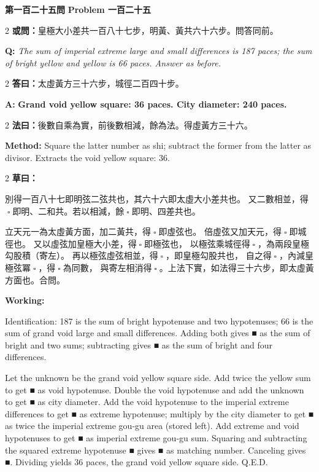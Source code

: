 \documentclass[11pt,a4paper]{article}
\let\origsquare\square
\renewcommand{\square}{\ensuremath{\origsquare}}%
\newcommand{\wen}[1]{%
  \par\vspace{0.5em}%
  \noindent\textcolor{problemcolor}{\textbf{第#1問}}%
  \hfill\textcolor{problemcolor}{\textbf{Problem #1}}\par\nopagebreak%
  \vspace{0.3em}%
}
\newcommand{\owen}[1]{%
  \noindent\textcolor{problemcolor}{\textbf{或問：}}{\tradfont #1}\par\nopagebreak%
}
\newcommand{\oweneng}[1]{%
  \noindent\textcolor{engcolor}{\textbf{Q: }}{\itshape #1}\par\nopagebreak%
}
\newcommand{\fayue}[1]{%
  \noindent\textcolor{methodcolor}{\textbf{法曰：}}{\tradfont #1}\par\nopagebreak%
}
\newcommand{\fayueeng}[1]{%
  \noindent\textcolor{engcolor}{\textbf{Method: }}{#1}\par\nopagebreak%
}
\newcommand{\tsaoyue}[1]{%
  \noindent\textcolor{workcolor}{\textbf{草曰：}}{\tradfont #1}\par%
}
\newcommand{\tsaoyueeng}[1]{%
  \noindent\textcolor{engcolor}{\textbf{Working: }}{\small #1}\par%
}
\newcommand{\dayue}[1]{%
  \noindent\textcolor{anscolor}{\textbf{答曰：}}{\tradfont #1}\par\nopagebreak%
}
\newcommand{\dayueeng}[1]{%
  \noindent\textcolor{engcolor}{\textbf{A: }}{\bfseries #1}\par\nopagebreak%
}
\begin{document}
\vspace{0.5cm}

\wen{一百二十五}

\begin{paracol}{2}
\owen{皇極大小差共一百八十七步，明黃、黃共六十六步。問答同前。}
\switchcolumn
\oweneng{The sum of imperial extreme large and small differences is 187 paces; the sum of bright yellow and yellow is 66 paces. Answer as before.}
\end{paracol}

\begin{paracol}{2}
\dayue{太虛黃方三十六步，城徑二百四十步。}
\switchcolumn
\dayueeng{Grand void yellow square: 36 paces. City diameter: 240 paces.}
\end{paracol}

\begin{paracol}{2}
\fayue{後數自乘為實，前後數相減，餘為法。得虛黃方三十六。}
\switchcolumn
\fayueeng{Square the latter number as shi; subtract the former from the latter as divisor. Extracts the void yellow square: 36.}
\end{paracol}

\begin{paracol}{2}
\tsaoyue{%
別得一百八十七即明弦二弦共也，其六十六即太虛大小差共也。
又二數相並，得$ \; \square \; $即明、二和共。若以相減，餘$ \; \square \; $即明、四差共也。

立天元一為太虛黃方面，加二黃共，得$ \; \square \; $即虛弦也。
倍虛弦又加天元，得$ \; \square \; $即城徑也。
又以虛弦加皇極大小差，得$ \; \square \; $即極弦也，
以極弦乘城徑得$ \; \square \; $，為兩段皇極勾股積（寄左）。
再以極弦虛弦相並，得$ \; \square \; $，即皇極勾股共也，
自之得$ \; \square \; $，內減皇極弦冪$ \; \square \; $，得$ \; \square \; $為同數，
與寄左相消得$ \; \square \; $。上法下實，如法得三十六步，即太虛黃方面也。合問。}
\switchcolumn
\tsaoyueeng{%
Identification: 187 is the sum of bright hypotenuse and two hypotenuses; 66 is the sum of grand void large and small differences. Adding both gives ■ as the sum of bright and two sums; subtracting gives ■ as the sum of bright and four differences.

Let the unknown be the grand void yellow square side. Add twice the yellow sum to get ■ as void hypotenuse. Double the void hypotenuse and add the unknown to get ■ as city diameter. Add the void hypotenuse to the imperial extreme differences to get ■ as extreme hypotenuse; multiply by the city diameter to get ■ as twice the imperial extreme gou-gu area (stored left). Add extreme and void hypotenuses to get ■ as imperial extreme gou-gu sum. Squaring and subtracting the squared extreme hypotenuse ■ gives ■ as matching number. Canceling gives ■. Dividing yields 36 paces, the grand void yellow square side. Q.E.D.}
\end{paracol}
\end{document}
